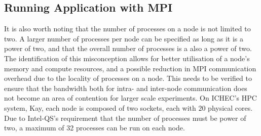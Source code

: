 \subsection{Running Application with MPI}
\label{sec:Enabling_MPI__Running_Application_with_MPI}
It is also worth noting that the number of processes on a node is not limited to two. A larger number of processes per node can be specified as long as it is a power of two, and that the overall number of processes is a also a power of two. The identification of this misconception allows for better utilisation of a node's memory and compute resources, and a possible reduction in MPI communication overhead due to the locality of processes on a node. This needs to be verified to ensure that the bandwidth both for intra- and inter-node communication does not become an area of contention for larger scale experiments. On ICHEC's HPC system, Kay, each node is composed of two sockets, each with $20$ physical cores. Due to Intel\textregistered-QS's requirement that the number of processes must be power of two, a maximum of 32 processes can be run on each node.